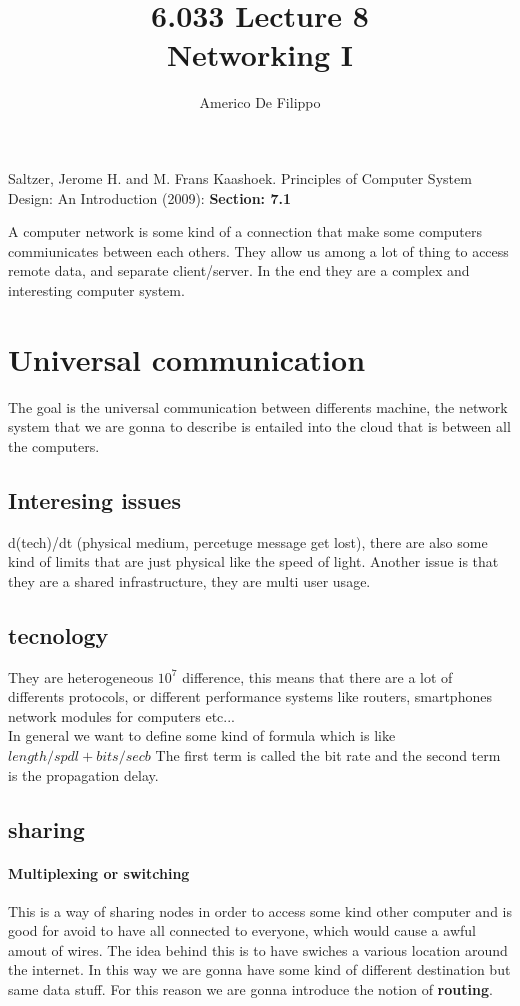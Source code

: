 \documentclass{article}
\title{6.033 Lecture 8 \\ Networking I}
\author{Americo De Filippo}
\begin{document}
 
  \maketitle
  \begin{thebibliography}{9}
    Saltzer, Jerome H. and M. Frans Kaashoek. Principles of Computer System Design: An Introduction (2009): \textbf{Section: 7.1}
\end{thebibliography}
  A computer network is some kind of a connection that make some 
  computers commiunicates between each others. They allow us among 
  a lot of thing to access remote data, and separate client/server. 
  In the end they are a complex and interesting computer system.
  \section{Universal communication}
    The goal is the universal communication between differents machine, 
    the network system that we are gonna to describe is entailed into the
    cloud that is between all the computers. 
    \subsection{Interesing issues}
      d(tech)/dt (physical medium, percetuge message get lost), there are also
      some kind of limits that are just physical like the speed of light. Another
      issue is that they are a shared infrastructure, they are multi user usage.
    \subsection{tecnology}
      They are heterogeneous $10^7$ difference, this means that there are a lot of 
      differents protocols, or different performance systems like routers, smartphones 
      network modules for computers etc...  \\ In general we want to define some kind of 
      formula which is like $length/spdl + bits/secb$ The first term is called the bit rate
      and the second term is the propagation delay.
    \subsection{sharing}
      \paragraph{Multiplexing or switching} This is a way of sharing nodes in order to access some kind 
        other computer and is good for avoid to have all connected to everyone, which would
        cause a awful amout of wires. The idea behind this is to have swiches a various 
        location around the internet. In this way we are gonna have some kind of different 
        destination but same data stuff. For this reason we are gonna introduce the notion
        of \textbf{routing}.
\end{document}
